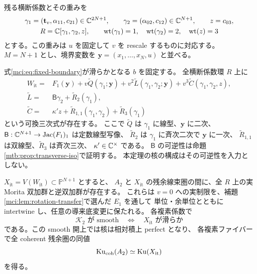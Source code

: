 残る横断係数とその重みを
\begin{equation}\label{mci:eq:transverse-weights}
 \begin{gathered}
 \gamma_1=(\mathbf t_v,\alpha_{11},c_{21})\in\mathbb C^{2N+1},\qquad
 \gamma_2=(\alpha_{02},c_{12})\in\mathbb C^{N+1},\qquad z=c_{03},\\
 R=\mathbb C[\gamma_1,\gamma_2,z],\qquad
 \operatorname{wt}(\gamma_1)=1,\quad
 \operatorname{wt}(\gamma_2)=2,\quad\operatorname{wt}(z)=3
 \end{gathered}
\end{equation}
とする。この重みは $u$ を固定して $v$ を rescale するものに対応する。
$M=N+1$ とし、境界変数を $\mathbf y=(x_1,\ldots,x_N,u)$ と並べる。

\begin{theorem}[滑らかな一中央切断を持つ二中心族の実核]
\label{mci:thm:iterated-kernel}
式\eqref{mci:eq:fixed-boundary}が滑らかとなる $b$ を固定する。
全横断係数環 $R$ 上に
\begin{equation}\label{mci:eq:target}
 \begin{split}
 W_{\mathrm{it}}={}&F_1(\mathbf y)+v\widetilde Q(\gamma_1;\mathbf y)
       +v^2\widetilde L(\gamma_1,\gamma_2;\mathbf y)
       +v^3\widetilde C(\gamma_1,\gamma_2,z),\\
 \widetilde L={}&\mathsf B\gamma_2+\widetilde R_2(\gamma_1),\\
 \widetilde C={}&\kappa' z+\widetilde R_{1,1}(\gamma_1,\gamma_2)
                              +\widetilde R_3(\gamma_1)
 \end{split}
\end{equation}
という可換三次式が存在する。
ここで $\widetilde Q$ は $\gamma_1$ に線型、$\mathbf y$ に二次、
$\mathsf B:\mathbb C^{N+1}\to\operatorname{Jac}(F_1)_1$ は定数線型写像、
$\widetilde R_2$ は $\gamma_1$ に斉次二次で $\mathbf y$ に一次、
$\widetilde R_{1,1}$ は双線型、$\widetilde R_3$ は斉次三次、
$\kappa'\in\mathbb C^\times$ である。
$\mathsf B$ の可逆性は命題\ref{mtb:prop:transverse-iso}で証明する。
本定理の核の構成はその可逆性を入力としない。

$X_{\mathrm{it}}=V(W_{\mathrm{it}})\subset\mathbb P^{N+1}$ とすると、
$A_2$ と $X_{\mathrm{it}}$ の残余線束圏の間に、全 $R$ 上の実 Morita 双加群と逆双加群が存在する。
これらは $v=0$ への実制限を、補題\ref{mci:lem:rotation-transfer}で選んだ $E_1$ を通して
単位・余単位とともに intertwine し、任意の導来底変更に保たれる。
各複素係数で
\[
 \mathcal K_2\text{ が smooth}\quad\Longleftrightarrow\quad
 X_{\mathrm{it}}\text{ が滑らか}
\]
である。この smooth 開上では核は相対積上 perfect となり、
各複素ファイバーで全 coherent 残余圏の同値
\[
          \operatorname{Ku}_{\mathrm{coh}}(A_2)\simeq\operatorname{Ku}(X_{\mathrm{it}})
\]
を得る。
\end{theorem}


